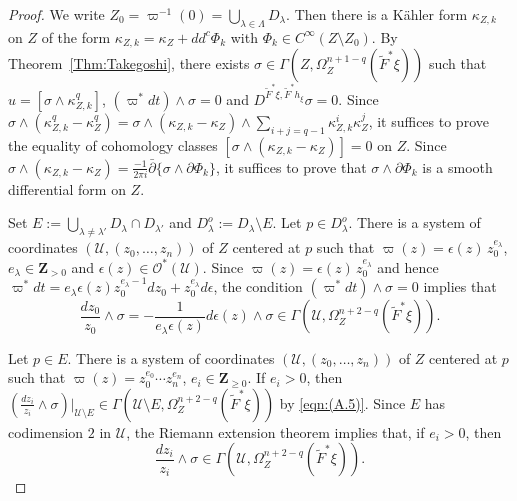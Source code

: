 \documentclass[amscd, leqno]{amsart}
\theoremstyle{plain}
\theoremstyle{definition}
\theoremstyle{remark}
\newenvironment{pf}{\begin{proof}}{\end{proof}}
\begin{document}
\begin{pf}
We write $Z_{0} = \varpi^{-1}(0) =\bigcup_{\lambda\in\Lambda}D_{\lambda}$.
Then there is a K\"ahler form $\kappa_{Z,k}$ on $Z$ of the form $\kappa_{Z,k} = \kappa_{Z} + dd^{c}\Phi_{k}$ with 
$\Phi_{k} \in C^{\infty}(Z\setminus Z_{0})$. 
By Theorem~\ref{Thm:Takegoshi}, there exists $\sigma \in \Gamma(Z,\Omega_{Z}^{n+1-q}(\widetilde{F}^{*}\xi))$ such that
$u=[\sigma \wedge \kappa_{Z,k}^{q}]$, $(\varpi^{*}dt)\wedge\sigma=0$ and $D^{\widetilde{F}^{*}\xi, \widetilde{F}^{*}h_{\xi}} \sigma =0$.
Since 
$\sigma\wedge(\kappa_{Z,k}^{q}-\kappa_{Z}^{q}) 
= \sigma\wedge(\kappa_{Z,k}-\kappa_{Z})\wedge\sum_{i+j=q-1} \kappa_{Z,k}^{i}\kappa_{Z}^{j}$,
it suffices to prove the equality of cohomology classes $[\sigma\wedge(\kappa_{Z,k}-\kappa_{Z})]=0$ on $Z$.
Since $\sigma\wedge(\kappa_{Z,k}-\kappa_{Z}) = \frac{-1}{2\pi i} \bar{\partial}\{\sigma\wedge\partial\Phi_{k}\}$,
it suffices to prove that $\sigma\wedge\partial\Phi_{k}$ is a smooth differential form on $Z$.
\par
Set $E := \bigcup_{\lambda\not=\lambda'}D_{\lambda}\cap D_{\lambda'}$ and $D_{\lambda}^{o} := D_{\lambda}\setminus E$.
Let $p\in D_{\lambda}^{o}$. There is a system of coordinates $({\mathcal U},(z_{0},\ldots,z_{n}))$ of $Z$ centered at $p$ such that 
$\varpi(z)=\epsilon(z)\,z_{0}^{e_{\lambda}}$, $e_{\lambda} \in {\mathbf Z}_{>0}$ and $\epsilon(z)\in{\mathcal O}^{*}({\mathcal U})$. 
Since $\varpi(z)=\epsilon(z)\,z_{0}^{e_{\lambda}}$ and hence 
$\varpi^{*}dt = e_{\lambda}\epsilon(z)z_{0}^{e_{\lambda}-1}dz_{0}+z_{0}^{e_{\lambda}}d\epsilon$,
the condition $(\varpi^{*}dt) \wedge \sigma=0$ implies that 
\begin{equation}
\label{eqn:(A.5)}
\frac{dz_{0}}{z_{0}} \wedge \sigma = -\frac{1}{e_{\lambda}\epsilon(z)}d\epsilon(z)\wedge\sigma
\in
\Gamma( {\mathcal U}, \Omega_{Z}^{n+2-q}(\widetilde{F}^{*}\xi)).
\end{equation}
\par
Let $p \in E$. There is a system of coordinates $({\mathcal U},(z_{0},\ldots,z_{n}))$ of $Z$ centered at $p$ such that 
$\varpi(z) = z_{0}^{e_{0}}\cdots z_{n}^{e_{n}}$, $e_{i} \in {\mathbf Z}_{\geq0}$.
If $e_{i}>0$, then 
$(\frac{dz_{i}}{z_{i}}\wedge\sigma)|_{{\mathcal U} \setminus E} \in 
\Gamma({\mathcal U} \setminus E, \Omega_{Z}^{n+2-q}(\widetilde{F}^{*}\xi))$
by \eqref{eqn:(A.5)}. Since $E$ has codimension $2$ in ${\mathcal U}$, the Riemann extension theorem implies that, if $e_{i}>0$, 
then
\begin{equation}
\label{eqn:(A.6)}
\frac{dz_{i}}{z_{i}}\wedge\sigma \in \Gamma( {\mathcal U}, \Omega_{Z}^{n+2-q}(\widetilde{F}^{*}\xi) ).

\end{equation}
\end{pf}
\end{document}

